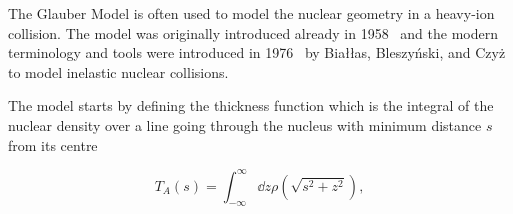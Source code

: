 



The Glauber Model is often used to model the nuclear geometry in a heavy-ion collision. The model was originally introduced already in 1958~\cite{Glauber:1959} and the modern terminology and tools were introduced in 1976~\cite{Biallas1976461} by Białłas, Bleszyński, and Czyż to model inelastic nuclear collisions.

The model starts by defining the thickness function which is the integral of the nuclear density over a line going through the nucleus with minimum distance $s$ from its centre

\begin{equation}
T_A\left(s\right)=\int_{-\infty}^{\infty}\dd z \rho\left(\sqrt{s^2+z^2}\right),
\end{equation}

